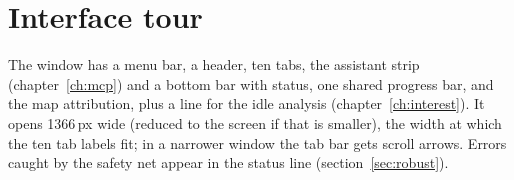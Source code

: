\chapter{Interface tour}\label{ch:interface}

The window has a menu bar, a header, ten tabs, the assistant strip (chapter~\ref{ch:mcp}) and a bottom bar with
status, one shared progress bar,  and the map attribution, plus a line for the idle analysis
(chapter~\ref{ch:interest}). It opens 1366\,px wide (reduced to the screen if that is smaller), the width at which the
ten tab labels fit; in a narrower window the tab bar gets scroll arrows. Errors caught by the safety net appear in the status line (section~\ref{sec:robust}).

